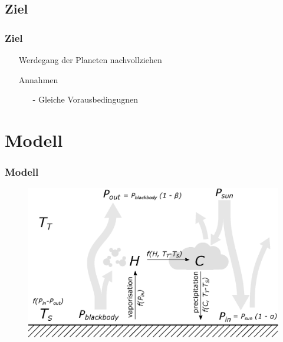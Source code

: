 \documentclass{beamer}
\begin{document}
\subsection{Ziel}
\begin{frame}
\frametitle{Ziel}
\begin{itemize}
	\item[] Werdegang der Planeten nachvollziehen
	\item[] Annahmen
	\begin{itemize}
	\item[-] Gleiche Vorausbedingugnen
	\end{itemize}
\end{itemize}
\end{frame}


\section{Modell} 
\begin{frame}
	\frametitle{Modell}
	\begin{figure}
		\includegraphics[width=\linewidth]{Model.eps}
	\end{figure}
\end{frame}
\end{document}
